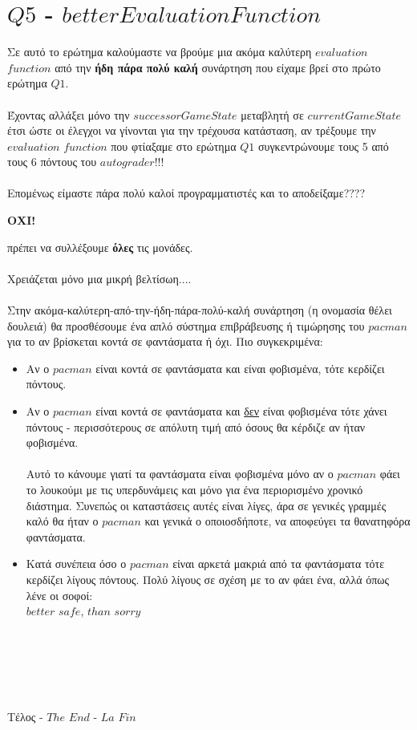 \documentclass[12pt]{article}
\begin{document}
\section*{$Q5$ - $betterEvaluationFunction$ }
Σε αυτό το ερώτημα καλούμαστε να βρούμε μια ακόμα καλύτερη $evaluation$ $function$ από την \textbf{ήδη πάρα πολύ καλή} συνάρτηση που είχαμε βρεί στο πρώτο ερώτημα $Q1$.\\\\
 Έχοντας αλλάξει μόνο την $successorGameState$ μεταβλητή σε $currentGameState$ έτσι ώστε οι έλεγχοι να γίνονται για την τρέχουσα κατάσταση, αν τρέξουμε την $evaluation$ $function$ που φτίαξαμε στο ερώτημα $Q1$ συγκεντρώνουμε τους 5 από τους 6 πόντους του $autograder$!!!\\\\
 Επομένως είμαστε πάρα πολύ καλοί προγραμματιστές και το αποδείξαμε????\\
 \begin{center}
 {\textbf{\Large{ΟΧΙ!}}} \\
 \end{center}
 πρέπει να συλλέξουμε \textbf{όλες} τις μονάδες.\\\\
 Χρειάζεται μόνο μια μικρή βελτίσωη....\\\\
 Στην ακόμα-καλύτερη-από-την-ήδη-πάρα-πολύ-καλή συνάρτηση (η ονομασία θέλει δουλειά) θα προσθέσουμε ένα απλό σύστημα επιβράβευσης ή τιμώρησης του $pacman$ για το αν βρίσκεται κοντά σε φαντάσματα ή όχι. Πιο συγκεκριμένα:\\
 \begin{itemize}
     \item Αν ο $pacman$ είναι κοντά σε φαντάσματα και είναι φοβισμένα, τότε κερδίζει πόντους.
     \item Αν ο $pacman$ είναι κοντά σε φαντάσματα και \underline{δεν} είναι φοβισμένα τότε χάνει πόντους - περισσότερους σε απόλυτη τιμή από όσους θα κέρδιζε αν ήταν φοβισμένα.\\\\
     Αυτό το κάνουμε γιατί τα φαντάσματα είναι φοβισμένα μόνο αν ο $pacman$ φάει το λουκούμι με τις υπερδυνάμεις και μόνο για ένα περιορισμένο χρονικό διάστημα. Συνεπώς οι καταστάσεις αυτές είναι λίγες, άρα σε γενικές γραμμές καλό θα ήταν ο $pacman$ και γενικά ο οποιοσδήποτε, να αποφεύγει τα θανατηφόρα φαντάσματα.
     \item Κατά συνέπεια όσο ο $pacman$ είναι αρκετά μακριά από τα φαντάσματα τότε κερδίζει λίγους πόντους. Πολύ λίγους σε σχέση με το αν φάει ένα, αλλά όπως λένε οι σοφοί:\\ $better$ $safe$, $than$ $sorry$\\\\\\\\\\\\
 \end{itemize}
 Τέλος - $The$ $End$ - $La$ $Fin$
\end{document}
